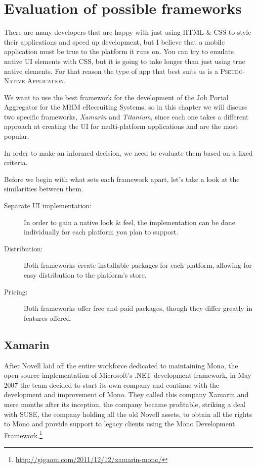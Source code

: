\chapter{Evaluation of possible frameworks}\label{ch:evaluation}

There are many developers that are happy with just using HTML \& CSS to style their applications and speed up development, but I believe that a mobile application must be true to the platform it runs on. You can try to emulate native \ac{UI} elements with CSS, but it is going to take longer than just using true native elements. For that reason the type of app that best suits us is a \textsc{Pseudo-Native Application}. 

We want to use the best framework for the development of the Job Portal Aggregator for the MHM eRecruiting Systems, so in this chapter we will discuss two specific frameworks, \emph{Xamarin} and \emph{Titanium}, since each one takes a different approach at creating the \ac{UI} for multi-platform applications and are the most popular.

In order to make an informed decision, we need to evaluate them based on a fixed criteria.

 

Before we begin with what sets each framework apart, let's take a look at the similarities between them.

\begin{description}
\item[Separate UI implementation:] In order to gain a native look \& feel, the implementation can be done individually for each platform you plan to support.
\item[Distribution:] Both frameworks create installable packages for each platform, allowing for easy distribution to the platform's store.
\item[Pricing:] Both frameworks offer free and paid packages, though they differ greatly in features offered.   
\end{description}


\section{Xamarin}
After Novell laid off the entire workforce dedicated to maintaining Mono, the open-source implementation of Microsoft's .NET development framework, in May 2007 the team decided to start its own company and continue with the development and improvement of Mono. They called this company Xamarin and mere months after its inception, the company became profitable, striking a deal with SUSE, the company holding all the old Novell assets, to obtain all the rights to Mono and provide support to legacy clients using the Mono Development Framework.\footnote{\url{http://gigaom.com/2011/12/12/xamarin-mono/}}

